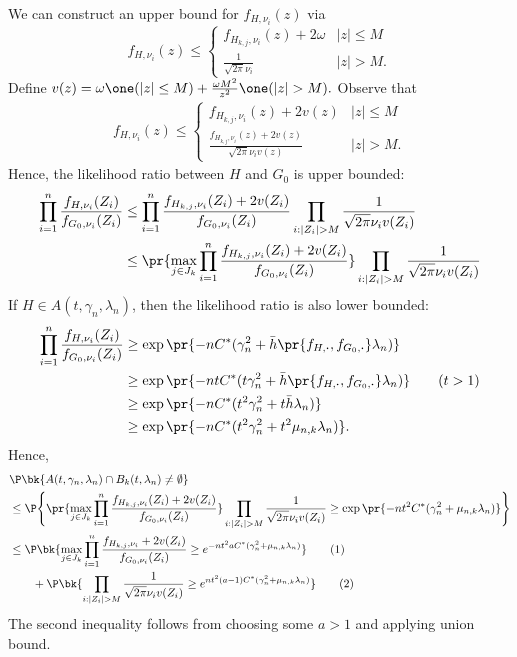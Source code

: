 \documentclass[12pt, reqno]{amsart}
\newcommand\numberthis{\addtocounter{equation}{1}\tag{\theequation}}
\newcommand{\fs}[1]{f_{#1, \boldsymbol{\cdot}}}
\newcommand{\barh}{\bar h}
\numberwithin{equation}{section}
\begin{document}
\begin{refsection}
\begin{appendices}
We can construct an upper bound for $f_{H, \nu_i}(z)$ via \[
f_{H, \nu_i}(z) \le \begin{cases}
    f_{H_{k,j}, \nu_i}(z) + 2 \omega & |z| \le M \\
    \frac{1}{\sqrt{2\pi} \nu_i} & |z| > M.
\end{cases}
\]
Define $v(z) = \omega \one(|z| \le M) + \frac{\omega M^2}{z^2} \one(|z| > M).$ Observe
that
\begin{align*}
f_{H,\nu_i}(z) \le
\begin{cases}
f_{H_{k,j}, \nu_i}(z) + 2v(z)   & |z| \le M\\
 \frac{f_{H_{k,j}, \nu_i}(z) + 2v(z)}{\sqrt{2\pi} \nu_i v(z)} & |z| > M.
\end{cases}
\end{align*}
Hence, the likelihood ratio between $H$ and $G_0$ is upper bounded:
\begin{align*}
\prod_{i=1}^n \frac{f_{H, \nu_i}(Z_i)}{ f_{G_0, \nu_i}(Z_i)} &\le
\prod_{i=1}^n \frac{f_{H_{k,j}, \nu_i}(Z_i) + 2v(Z_i)}{f_{G_0, \nu_i}(Z_i)} \prod_{i : |Z_i|
> M} \frac{1}{\sqrt{2\pi} \nu_i v(Z_i)} \\&\le \pr{\max_{j \in J_k}\prod_{i=1}^n \frac{f_
{H_
{k,j}, \nu_i}(Z_i) + 2v(Z_i)}{f_{G_0, \nu_i}(Z_i)}} \prod_{i : |Z_i|
> M} \frac{1}{\sqrt{2\pi} \nu_i v(Z_i)}
\end{align*}
If $H \in A(t, \gamma_n, \lambda_n)$, then the likelihood ratio is also lower bounded: \begin{align*}
\prod_{i=1}^n \frac{f_{H, \nu_i}(Z_i)}{ f_{G_0, \nu_i}(Z_i)} &\ge \exp\pr{-n C^*
(\gamma_n^2 + \barh\pr{\fs{H}, \fs{G_0}} \lambda_n)} \\& \ge \exp\pr{-n t C^*
(t\gamma_n^2 + \barh\pr{\fs{H}, \fs{G_0}} \lambda_n)} \tag{$t>1$} \\ 
&\ge \exp\pr{-n C^* (t^2 \gamma_n^2 + t \bar h \lambda_n)}\\
&\ge \exp\pr{-n C^* (t^2 \gamma_n^2 + t^2 \mu_{n,k} \lambda_n)}.
\end{align*}
Hence, \begin{align*}
&\P\bk{
    A(t, \gamma_n, \lambda_n) \cap B_k(t, \lambda_n) \neq \emptyset
} \\ &\le \P\Bigg\{
    \pr{\max_{j \in J_k}\prod_{i=1}^n \frac{f_{H_
{k,j}, \nu_i}(Z_i) + 2v(Z_i)}{f_{G_0, \nu_i}(Z_i)}} \prod_{i : |Z_i|
> M} \frac{1}{\sqrt{2\pi} \nu_i v(Z_i)} \ge \exp\pr{-nt^2 C^*(\gamma_n^2 +
\mu_{n,k} \lambda_n) }
\Bigg\}
\\
&\le
\P\bk{
    \max_{j\in J_k} \prod_{i=1}^n \frac{f_{H_{k,j}, \nu_i} + 2v(Z_i)}{f_{G_0, \nu_i}
    (Z_i)} \ge e^{-n t^2 a C^*  (\gamma_n^2 + \mu_{n,k} \lambda_n)}
} \numberthis \label{eq:term1}
\\
&\quad\quad+ \P\bk{
    \prod_{i:
|Z_i| > M} \frac{1}{\sqrt{2\pi} \nu_i v(Z_i) } \ge e^{n t^2 (a - 1) C^* (\gamma_n^2 +
 \mu_{n,k} \lambda_n)}
} \numberthis \label{eq:term2}
\end{align*}
The second
inequality follows from choosing some $a > 1$ and applying union bound.


\end{appendices}
\end{refsection}
\end{document}
